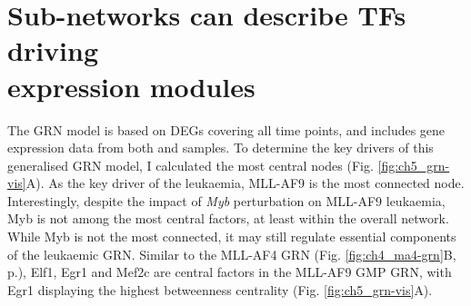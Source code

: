 \section[Sub-networks can describe TFs driving expression modules]{\label{ch5:sub-grn}Sub-networks can describe TFs driving\\expression modules}

The GRN model is based on DEGs covering all time points, and includes gene expression data from both \mybwt{} and \mybmre{} samples. To determine the key drivers of this generalised GRN model, I calculated the most central nodes (Fig. \ref{fig:ch5_grn-vis}A). As the key driver of the leukaemia, MLL-AF9 is the most connected node. Interestingly, despite the impact of \textit{Myb} perturbation on MLL-AF9 leukaemia, Myb is not among the most central factors, at least within the overall network. While Myb is not the most connected, it may still regulate essential components of the leukaemic GRN. Similar to the MLL-AF4 GRN (Fig. \ref{fig:ch4_ma4-grn}B, p.\pageref{fig:ch4_ma4-grn}), Elf1, Egr1 and Mef2c are central factors in the MLL-AF9 GMP GRN, with Egr1 displaying the highest betweenness centrality (Fig. \ref{fig:ch5_grn-vis}A). 

